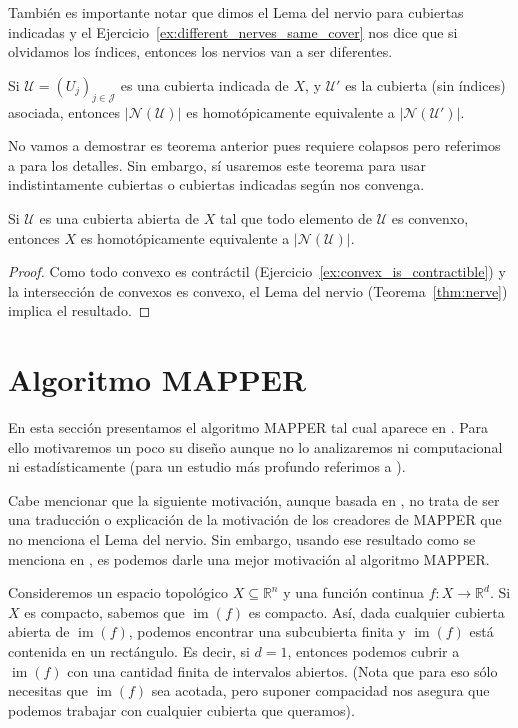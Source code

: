 \documentclass{standalone}
\begin{document}
	También es importante notar que dimos el Lema del nervio para cubiertas indicadas y el Ejercicio~\ref{ex:different_nerves_same_cover} nos dice que si olvidamos los índices, entonces los nervios van a ser diferentes.
	
	\begin{theorem}
		Si $\mathcal{U} = (U_{j})_{j\in\mathcal{J}}$ es una cubierta indicada de $X$, y $\mathcal{U}'$ es la cubierta (sin índices) asociada, entonces $|\mathcal{N}(\mathcal{U})|$ es homotópicamente equivalente a $|\mathcal{N}(\mathcal{U}')|$.
	\end{theorem}
	
	No vamos a demostrar es teorema anterior pues requiere colapsos \cite[Definición 1.36]{scoville:2019:discrete:morse} pero referimos a \cite[Remark 1.4]{BAUER:nerve} para los detalles. Sin embargo, sí usaremos este teorema para usar indistintamente cubiertas o cubiertas indicadas según nos convenga.
	
	\begin{corollary}\label{cor:nerve_convexes}
		Si $\mathcal{U}$ es una cubierta abierta de $X$ tal que todo elemento de $\mathcal{U}$ es convenxo, entonces $X$ es homotópicamente equivalente a $|\mathcal{N}(\mathcal{U})|$.
	\end{corollary}
	
	\begin{proof}
		Como todo convexo es contráctil (Ejercicio~\ref{ex:convex_is_contractible}) y la intersección de convexos es convexo, el Lema del nervio (Teorema~\ref{thm:nerve}) implica el resultado.
	\end{proof}
	
	\section{Algoritmo MAPPER}
	En esta sección presentamos el algoritmo MAPPER tal cual aparece en \cite{mapper}. Para ello motivaremos un poco su diseño aunque no lo analizaremos ni computacional ni estadísticamente (para un estudio más profundo referimos a \cite{carriere:mapper, tamal:mapper}).
	
	Cabe mencionar que la siguiente motivación, aunque basada en \cite[Sección 2.1]{mapper}, no trata de ser una traducción o explicación de la motivación de los creadores de MAPPER que no menciona el Lema del nervio. Sin embargo, usando ese resultado como se menciona en \cite[Sección 3]{chazal:frontiers}, es podemos darle una mejor motivación al algoritmo MAPPER. 
	
	Consideremos un espacio topológico $X\subseteq\mathbb{R}^{n}$ y una función continua $f\colon X\rightarrow \mathbb{R}^{d}$. Si $X$ es compacto, sabemos que $\operatorname{im}(f)$ es compacto. Así, dada cualquier cubierta abierta de $\operatorname{im}(f)$, podemos encontrar una subcubierta finita y  $\operatorname{im}(f)$ está contenida en un rectángulo. Es decir, si $d=1$, entonces podemos cubrir a $\operatorname{im}(f)$ con una cantidad finita de intervalos abiertos. (Nota que para eso sólo necesitas que $\operatorname{im}(f)$ sea acotada, pero suponer compacidad nos asegura que podemos trabajar con cualquier cubierta que queramos).
	
\end{document}
